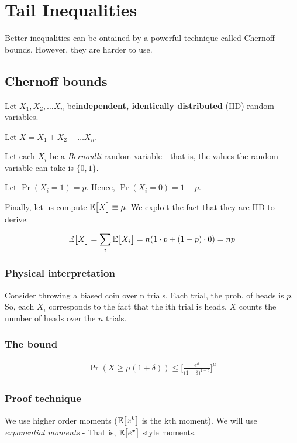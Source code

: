 \chapter{Tail Inequalities}

Better inequalities can be ontained by a powerful technique called
Chernoff bounds. However, they are harder to use.

\section{Chernoff bounds}

Let $X_1, X_2, \dots X_n$ be\textbf{independent, identically
distributed} (IID) random variables.

Let $X = X_1 + X_2 + \dots X_n$.

Let each $X_i$ be a \textit{Bernoulli} random variable - that is, the values
the random variable can take is $\{0, 1\}$.

Let $\Pr(X_i = 1) = p$. Hence, $\Pr(X_i = 0) = 1 - p$.

Finally, let us compute $\mathbb{E}\big[ X \big] \equiv \mu$. We exploit the fact that they are
IID to derive:

$$
\mathbb{E}\big[ X \big] = \sum_i \mathbb{E}\big[ X_i \big] = n (1 \cdot p + (1 - p) \cdot 0) = n p
$$

\subsection{Physical interpretation}

Consider throwing a biased coin over n trials. Each trial, the prob. of
heads is $p$. So, each $X_i$ corresponds to the fact that the ith trial is
heads. $X$ counts the number of heads over the $n$ trials.

\subsection{The bound}

\begin{align*}
\Pr(X \geq \mu (1 + \delta)) \leq
{\bigg[ \frac{e^\delta}{({1 + \delta)}^{1 + \delta}}} \bigg]^\mu
\end{align*}

\subsection{Proof technique}

We use higher order moments ($\mathbb{E}\big[ x^k \big]$ is the kth moment). We will use
\textit{exponential moments} - That is, $\mathbb{E}\big[ e^x \big]$ style moments.


